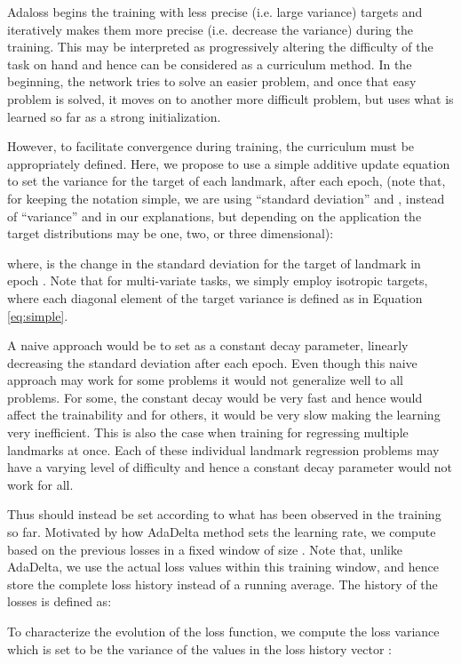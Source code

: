 \documentclass[10pt,twocolumn,letterpaper]{article}
\begin{document}
Adaloss begins the training with less precise (i.e. large variance) targets and iteratively makes them more precise (i.e. decrease the variance) during the training. This may be interpreted as progressively altering the difficulty of the task on hand and hence can be considered as a curriculum method. In the beginning, the network tries to solve an easier problem, and once that easy problem is solved, it moves on to another more difficult problem, but uses what is learned so far as a strong initialization.

However, to facilitate convergence during training, the curriculum must be appropriately defined. Here, we propose to use a simple additive update equation to set the variance for the target of each landmark,  after each epoch,  (note that, for keeping the notation simple, we are using ``standard deviation'' and , instead of ``variance'' and  in our explanations, but depending on the application the target distributions may be one, two, or three dimensional):

where,  is the change in the standard deviation for the target of landmark  in epoch . Note that for multi-variate tasks, we simply employ isotropic targets, where each diagonal element of the target variance is defined as in Equation \ref{eq:simple}.

A naive approach would be to set  as a constant decay parameter, linearly decreasing the standard deviation after each epoch. Even though this naive approach may work for some problems it would not generalize well to all problems. For some, the constant decay would be very fast and hence would affect the trainability and for others, it would be very slow making the learning very inefficient. This is also the case when training for regressing multiple landmarks at once. Each of these individual landmark regression problems may have a varying level of difficulty and hence a constant decay parameter would not work for all.



Thus  should instead be set according to what has been observed in the training so far. Motivated by how AdaDelta \cite{adadelta} method sets the learning rate, we compute  based on the previous losses in a fixed window of size . Note that, unlike AdaDelta, we use the actual loss values within this training window, and hence store the complete loss history instead of a running average. The history of the losses is defined as:


To characterize the evolution of the loss function, we compute the
loss variance  which is set to be the variance of the values in
the loss history vector :
\end{document}
